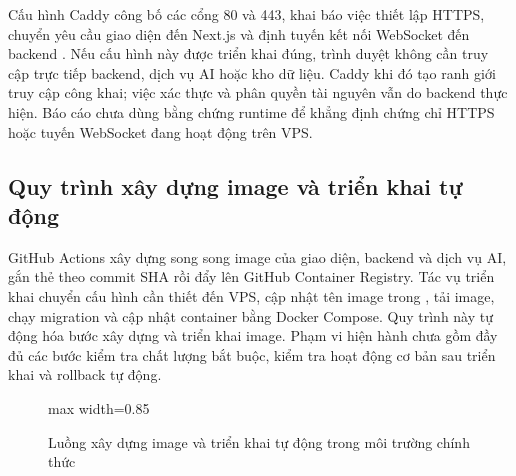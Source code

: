 Cấu hình Caddy công bố các cổng 80 và 443, khai báo việc thiết lập HTTPS, chuyển yêu cầu giao diện đến Next.js và định tuyến kết nối WebSocket đến backend \cite{ch3ref19}. Nếu cấu hình này được triển khai đúng, trình duyệt không cần truy cập trực tiếp backend, dịch vụ AI hoặc kho dữ liệu. Caddy khi đó tạo ranh giới truy cập công khai; việc xác thực và phân quyền tài nguyên vẫn do backend thực hiện. Báo cáo chưa dùng bằng chứng runtime để khẳng định chứng chỉ HTTPS hoặc tuyến WebSocket đang hoạt động trên VPS.

\subsection{Quy trình xây dựng image và triển khai tự động}

GitHub Actions xây dựng song song image của giao diện, backend và dịch vụ AI, gắn thẻ theo commit SHA rồi đẩy lên GitHub Container Registry. Tác vụ triển khai chuyển cấu hình cần thiết đến VPS, cập nhật tên image trong , tải image, chạy migration và cập nhật container bằng Docker Compose. Quy trình này tự động hóa bước xây dựng và triển khai image. Phạm vi hiện hành chưa gồm đầy đủ các bước kiểm tra chất lượng bắt buộc, kiểm tra hoạt động cơ bản sau triển khai và rollback tự động.

\begin{figure}[H]
  \centering
  \begin{adjustbox}{max width=0.85\textwidth}
  \end{adjustbox}
  \caption{Luồng xây dựng image và triển khai tự động trong môi trường chính thức}
  \label{fig:ch3-cicd-cut}
\end{figure}

